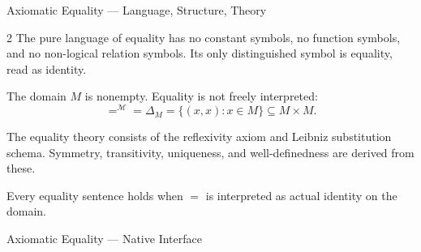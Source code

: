 \begin{lrachaptercard}{Axiomatic Equality --- Language, Structure, Theory}
\begin{multicols}{2}
The pure language of equality has no constant symbols, no function symbols,
and no non-logical relation symbols. Its only distinguished symbol is equality,
read as identity.

The domain \(M\) is nonempty. Equality is not freely interpreted:
\[
  =^{\mathcal M}=\Delta_M
  =\{(x,x):x\in M\}\subseteq M\times M.
\]

\columnbreak

The equality theory consists of the reflexivity axiom and Leibniz substitution
schema. Symmetry, transitivity, uniqueness, and well-definedness are derived
from these.

Every equality sentence holds when \(=\) is interpreted as actual identity on
the domain.
\end{multicols}
\end{lrachaptercard}

\begin{lratopiccard}{Axiomatic Equality --- Native Interface}
\begin{lrasignaturetable}
\end{lrasignaturetable}
\end{lratopiccard}

